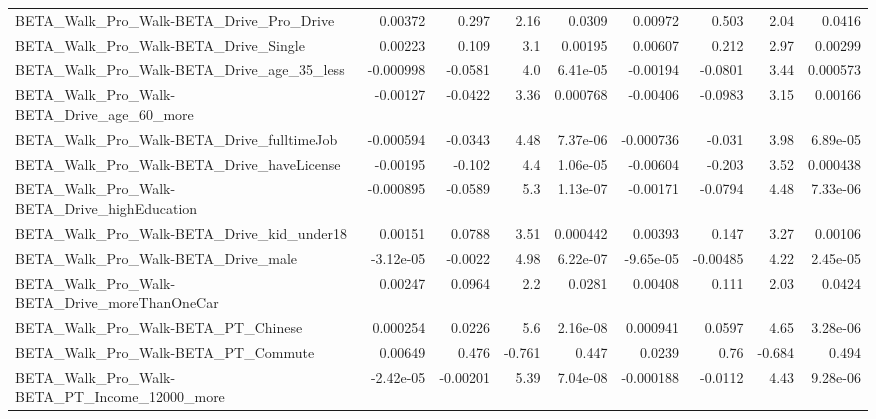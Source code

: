\begin{tabular}{lrrrrrrrr}
BETA\_Walk\_Pro\_Walk-BETA\_Drive\_Pro\_Drive            &     0.00372 &        0.297 &     2.16 &   0.0309 &    0.00972 &       0.503 &         2.04 &        0.0416 \\
BETA\_Walk\_Pro\_Walk-BETA\_Drive\_Single               &     0.00223 &        0.109 &      3.1 &  0.00195 &    0.00607 &       0.212 &         2.97 &       0.00299 \\
BETA\_Walk\_Pro\_Walk-BETA\_Drive\_age\_35\_less          &   -0.000998 &      -0.0581 &      4.0 & 6.41e-05 &   -0.00194 &     -0.0801 &         3.44 &      0.000573 \\
BETA\_Walk\_Pro\_Walk-BETA\_Drive\_age\_60\_more          &    -0.00127 &      -0.0422 &     3.36 & 0.000768 &   -0.00406 &     -0.0983 &         3.15 &       0.00166 \\
BETA\_Walk\_Pro\_Walk-BETA\_Drive\_fulltimeJob          &   -0.000594 &      -0.0343 &     4.48 & 7.37e-06 &  -0.000736 &      -0.031 &         3.98 &      6.89e-05 \\
BETA\_Walk\_Pro\_Walk-BETA\_Drive\_haveLicense          &    -0.00195 &       -0.102 &      4.4 & 1.06e-05 &   -0.00604 &      -0.203 &         3.52 &      0.000438 \\
BETA\_Walk\_Pro\_Walk-BETA\_Drive\_highEducation        &   -0.000895 &      -0.0589 &      5.3 & 1.13e-07 &   -0.00171 &     -0.0794 &         4.48 &      7.33e-06 \\
BETA\_Walk\_Pro\_Walk-BETA\_Drive\_kid\_under18          &     0.00151 &       0.0788 &     3.51 & 0.000442 &    0.00393 &       0.147 &         3.27 &       0.00106 \\
BETA\_Walk\_Pro\_Walk-BETA\_Drive\_male                 &   -3.12e-05 &      -0.0022 &     4.98 & 6.22e-07 &  -9.65e-05 &    -0.00485 &         4.22 &      2.45e-05 \\
BETA\_Walk\_Pro\_Walk-BETA\_Drive\_moreThanOneCar       &     0.00247 &       0.0964 &      2.2 &   0.0281 &    0.00408 &       0.111 &         2.03 &        0.0424 \\
BETA\_Walk\_Pro\_Walk-BETA\_PT\_Chinese                 &    0.000254 &       0.0226 &      5.6 & 2.16e-08 &   0.000941 &      0.0597 &         4.65 &      3.28e-06 \\
BETA\_Walk\_Pro\_Walk-BETA\_PT\_Commute                 &     0.00649 &        0.476 &   -0.761 &    0.447 &     0.0239 &        0.76 &       -0.684 &         0.494 \\
BETA\_Walk\_Pro\_Walk-BETA\_PT\_Income\_12000\_more       &   -2.42e-05 &     -0.00201 &     5.39 & 7.04e-08 &  -0.000188 &     -0.0112 &         4.43 &      9.28e-06 \\

\end{tabular}

